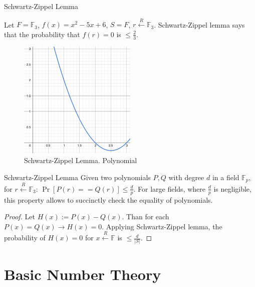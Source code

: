 \documentclass{beamer}
\begin{document}
    \begin{frame}{Schwartz-Zippel Lemma}
        \begin{definition}
            Let $F = \mathbb{F}_3$, $f(x) = x^2 - 5x + 6$, $S = F$, $r \xleftarrow{R} \mathbb{F}_3$.
            Schwartz-Zippel lemma says that the probability that $f(r) = 0$ is $\le \frac{2}{3}$.
        \end{definition}
  
        \begin{figure}
          \centering
          \includegraphics[width=0.5\textwidth]{images/lecture_2/Schwartz-Zippel-2.png}
          \caption{Schwartz-Zippel Lemma. Polynomial}
          \label{fig:schwartz-2}
        \end{figure}
    \end{frame}

    \begin{frame}{Schwartz-Zippel Lemma}
        Given two polynomials $P, Q$ with  degree $d$ in a field $\mathbb{F}_p$, for $r \xleftarrow{R} \mathbb{F}_3$: $\Pr[P(r) == Q(r)] \le \frac{d}{p}$.
        For large fields, where  $\frac{d}{p}$ is negligible, this property allows to succinctly check the equality of polynomials.

    \begin{proof}
        Let $H(x) := P(x) - Q(x)$. Than for each $P(x) = Q(x) \rightarrow H(x) = 0$. Applying Schwartz-Zippel lemma, the probability of $H(x) = 0$ for $x \xleftarrow{R} \mathbb{F} $ is $\le \frac{d}{|S|}$.
    \end{proof}
        
    \end{frame}

    \section{Basic Number Theory}
\end{document}
